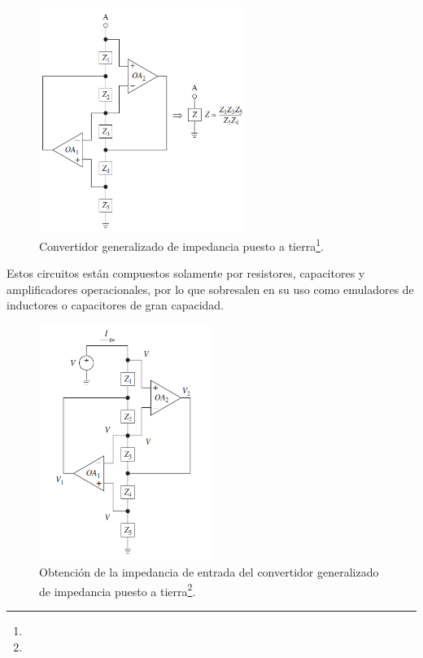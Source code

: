 \begin{figure}[H]
	\centering
	\includegraphics[width=0.6\textwidth]{Imagenes1/gic.PNG}
	\caption[]{Convertidor generalizado de impedancia puesto a tierra\protect\footnote{}.}
	\label{fig:gic}
\end{figure}


Estos circuitos están compuestos solamente por resistores, capacitores y amplificadores operacionales, por lo que sobresalen en su uso como emuladores de inductores o capacitores de gran capacidad.

\begin{figure}[H]
	\centering
	\includegraphics[width=0.5\textwidth]{Imagenes1/gic_zin.PNG}
	\caption[]{Obtención de la impedancia de entrada del convertidor generalizado de impedancia puesto a tierra\protect\footnote{}.}
	\label{fig:gic_zin}
\end{figure}

